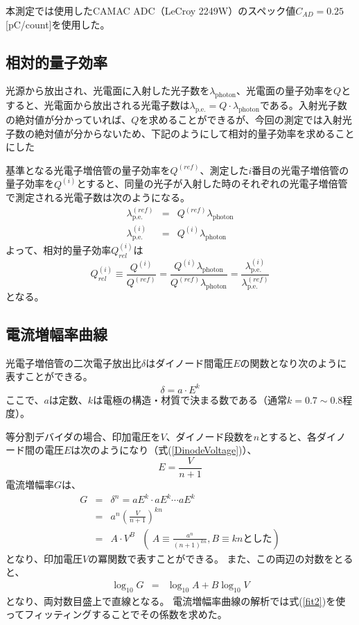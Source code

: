 \documentclass[11pt]{ltjsreport}
\newcommand{\equref}[1]{式(\ref{#1})}
\newcommand{\photon}{\mathrm{photon}}
\newcommand{\pe}{\mathrm{p.e.}}
\begin{document}
本測定では使用したCAMAC ADC（LeCroy 2249W）のスペック値$C_{AD}=0.25$ [pC/count]を使用した。

\subsection{相対的量子効率}
光源から放出され、光電面に入射した光子数を$\lambda_{\photon}$、光電面の量子効率を$Q$とすると、光電面から放出される光電子数は$\lambda_{\pe}=Q \cdot \lambda_{\photon}$である。入射光子数の絶対値が分かっていれば、$Q$を求めることができるが、今回の測定では入射光子数の絶対値が分からないため、下記のようにして相対的量子効率を求めることにした

基準となる光電子増倍管の量子効率を$Q^{(ref)}$、測定した$i$番目の光電子増倍管の量子効率を$Q^{(i)}$とすると、同量の光子が入射した時のそれぞれの光電子増倍管で測定される光電子数は次のようになる。
\begin{eqnarray}
\lambda_{\pe}^{(ref)} & =  & Q^{(ref)}\lambda_{\photon}\\
\lambda_{\pe}^{(i)} & = & Q^{(i)}\lambda_{\photon}
\end{eqnarray}
よって、相対的量子効率$Q_{rel}^{(i)}$は
\begin{equation}
Q_{rel}^{(i)} \equiv \frac{Q^{(i)}}{Q^{(ref)}}%
 = \frac{Q^{(i)}\lambda_{\photon}}{Q^{(ref)}\lambda_{\photon}} %
 = \frac{\lambda_{\pe}^{(i)}}{\lambda_{\pe}^{(ref)}}%
\end{equation}
となる。


\subsection{電流増幅率曲線}
光電子増倍管の二次電子放出比$\delta$はダイノード間電圧$E$の関数となり次のように表すことができる。
\begin{equation}
\delta = a \cdot E^{k}
\label{SecPEratio}
\end{equation}
ここで、$a$は定数、$k$は電極の構造・材質で決まる数である（通常$k=0.7\sim0.8$程度）。

等分割デバイダの場合、印加電圧を$V$、ダイノード段数を$n$とすると、各ダイノード間の電圧$E$は次のようになり（\equref{DinodeVoltage}）、
\begin{equation}
E=\frac{V}{n+1}
\label{DinodeVoltage}
\end{equation}
電流増幅率$G$は、
\begin{eqnarray}
G & = &  \delta^{n} = aE^{k} \cdot aE^{k} \cdots aE^{k}  \nonumber \\
& = & a^{n} \left(\frac{V}{n+1}\right)^{kn}  \nonumber \\
& = & A \cdot V^{B}
\ \ \ \left(\ A \equiv \frac{a^{n}}{(n+1)^{kn}}, B\equiv kn  \text{とした}\right) \label{fit1}
\end{eqnarray}
となり、印加電圧$V$の冪関数で表すことができる。
また、この両辺の対数をとると、
\begin{eqnarray}
\log_{10}G & = & \log_{10}A + B \log_{10}V \label{fit2}
\end{eqnarray}
となり、両対数目盛上で直線となる。
電流増幅率曲線の解析では\equref{fit2}を使ってフィッティングすることでその係数を求めた。
\end{document}
